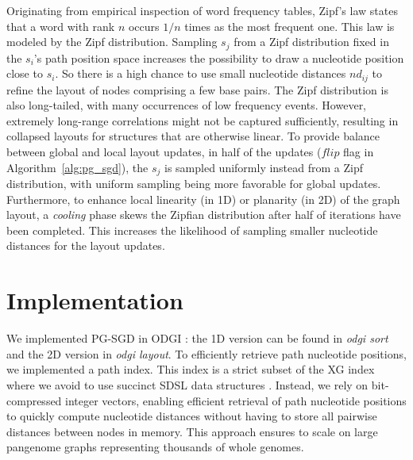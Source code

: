 \documentclass{bioinfo}
\theoremstyle{definition}
\begin{document}
	Originating from empirical inspection of word frequency tables, Zipf's law states that a word with rank $n$ occurs $1/n$ times as the most frequent one.
    This law is modeled by the Zipf distribution.%
	Sampling $s_j$ from a Zipf distribution fixed in the $s_i$'s path position space increases the possibility to draw a nucleotide position close to $s_i$.
	So there is a high chance to use small nucleotide distances $nd_{ij}$ to refine the layout of nodes comprising a few base pairs.
    The Zipf distribution is also long-tailed, with many occurrences of low frequency events.
	However, extremely long-range correlations might not be captured sufficiently, resulting in collapsed layouts for structures that are otherwise linear.
    To provide balance between global and local layout updates, in half of the updates ($flip$ flag in Algorithm~\ref{alg:pg_sgd}), the $s_j$ is sampled uniformly instead from a Zipf distribution, with uniform sampling being more favorable for global updates.
	Furthermore, to enhance local linearity (in 1D) or planarity (in 2D) of the graph layout, a \textit{cooling} phase skews the Zipfian distribution after half of iterations have been completed.
	This increases the likelihood of sampling smaller nucleotide distances for the layout updates.

	

	\section{Implementation}
	
	We implemented PG-SGD in ODGI \citep{Guarracino2022}: the 1D version can be found in \textit{odgi sort} and the 2D version in \textit{odgi layout}. %
	To efficiently retrieve path nucleotide positions, we implemented a path index.
	This index is a strict subset of the XG index~\citep{Garrison:2018} where we avoid to use succinct SDSL data structures \citep{Gog2014}.
	Instead, we rely on bit-compressed integer vectors, enabling efficient retrieval of path nucleotide positions to quickly compute nucleotide distances without having to store all pairwise distances between nodes in memory.
	This approach ensures to scale on large pangenome graphs representing thousands of whole genomes.
\end{document}
